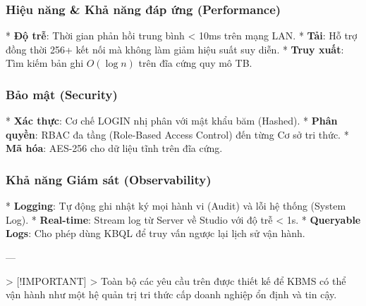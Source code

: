 \subsubsection{Hiệu năng & Khả năng đáp ứng (Performance)}
*   \textbf{Độ trễ}: Thời gian phản hồi trung bình < 10ms trên mạng LAN.
*   \textbf{Tải}: Hỗ trợ đồng thời 256+ kết nối mà không làm giảm hiệu suất suy diễn.
*   \textbf{Truy xuất}: Tìm kiếm bản ghi $O(\log n)$ trên đĩa cứng quy mô TB.

\subsubsection{Bảo mật (Security)}
*   \textbf{Xác thực}: Cơ chế LOGIN nhị phân với mật khẩu băm (Hashed).
*   \textbf{Phân quyền}: RBAC đa tầng (Role-Based Access Control) đến từng Cơ sở tri thức.
*   \textbf{Mã hóa}: AES-256 cho dữ liệu tĩnh trên đĩa cứng.

\subsubsection{Khả năng Giám sát (Observability)}
*   \textbf{Logging}: Tự động ghi nhật ký mọi hành vi (Audit) và lỗi hệ thống (System Log).
*   \textbf{Real-time}: Stream log từ Server về Studio với độ trễ < 1s.
*   \textbf{Queryable Logs}: Cho phép dùng KBQL để truy vấn ngược lại lịch sử vận hành.

---

> [!IMPORTANT]
> Toàn bộ các yêu cầu trên được thiết kế để KBMS có thể vận hành như một hệ quản trị tri thức cấp doanh nghiệp ổn định và tin cậy.

